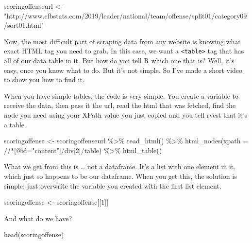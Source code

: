 \documentclass[
]{book}
\newenvironment{Shaded}{\begin{snugshade}}{\end{snugshade}}
\newcommand{\AttributeTok}[1]{\textcolor[rgb]{0.77,0.63,0.00}{#1}}
\newcommand{\DecValTok}[1]{\textcolor[rgb]{0.00,0.00,0.81}{#1}}
\newcommand{\FunctionTok}[1]{\textcolor[rgb]{0.00,0.00,0.00}{#1}}
\newcommand{\NormalTok}[1]{#1}
\newcommand{\OtherTok}[1]{\textcolor[rgb]{0.56,0.35,0.01}{#1}}
\newcommand{\SpecialCharTok}[1]{\textcolor[rgb]{0.00,0.00,0.00}{#1}}
\newcommand{\StringTok}[1]{\textcolor[rgb]{0.31,0.60,0.02}{#1}}
\begin{document}
\begin{Shaded}
\begin{Highlighting}[]
\NormalTok{scoringoffenseurl }\OtherTok{\textless{}{-}} \StringTok{"http://www.cfbstats.com/2019/leader/national/team/offense/split01/category09/sort01.html"}
\end{Highlighting}
\end{Shaded}

Now, the most difficult part of scraping data from any website is knowing what exact HTML tag you need to grab. In this case, we want a \texttt{\textless{}table\textgreater{}} tag that has all of our data table in it. But how do you tell R which one that is? Well, it's easy, once you know what to do. But it's not simple. So I've made a short video to show you how to find it.

When you have simple tables, the code is very simple. You create a variable to receive the data, then pass it the url, read the html that was fetched, find the node you need using your XPath value you just copied and you tell rvest that it's a table.

\begin{Shaded}
\begin{Highlighting}[]
\NormalTok{scoringoffense }\OtherTok{\textless{}{-}}\NormalTok{ scoringoffenseurl }\SpecialCharTok{\%\textgreater{}\%}
  \FunctionTok{read\_html}\NormalTok{() }\SpecialCharTok{\%\textgreater{}\%}
  \FunctionTok{html\_nodes}\NormalTok{(}\AttributeTok{xpath =} \StringTok{\textquotesingle{}//*[@id="content"]/div[2]/table\textquotesingle{}}\NormalTok{) }\SpecialCharTok{\%\textgreater{}\%}
  \FunctionTok{html\_table}\NormalTok{()}
\end{Highlighting}
\end{Shaded}

What we get from this is \ldots{} not a dataframe. It's a list with one element in it, which just so happens to be our dataframe. When you get this, the solution is simple: just overwrite the variable you created with the first list element.

\begin{Shaded}
\begin{Highlighting}[]
\NormalTok{scoringoffense }\OtherTok{\textless{}{-}}\NormalTok{ scoringoffense[[}\DecValTok{1}\NormalTok{]]}
\end{Highlighting}
\end{Shaded}

And what do we have?

\begin{Shaded}
\begin{Highlighting}[]
\FunctionTok{head}\NormalTok{(scoringoffense)}
\end{Highlighting}
\end{Shaded}
\end{document}

